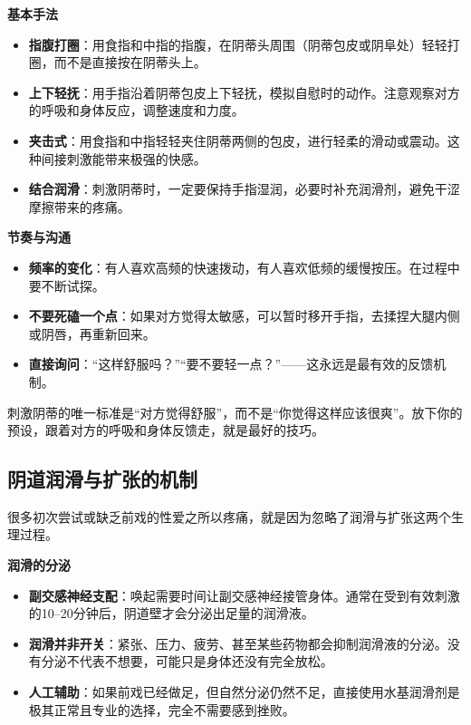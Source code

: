 \documentclass[12pt,UTF8]{ctexbook}
\begin{document}
\textbf{基本手法}

\begin{itemize}
\item \textbf{指腹打圈}：用食指和中指的指腹，在阴蒂头周围（阴蒂包皮或阴阜处）轻轻打圈，而不是直接按在阴蒂头上。
\item \textbf{上下轻抚}：用手指沿着阴蒂包皮上下轻抚，模拟自慰时的动作。注意观察对方的呼吸和身体反应，调整速度和力度。
\item \textbf{夹击式}：用食指和中指轻轻夹住阴蒂两侧的包皮，进行轻柔的滑动或震动。这种间接刺激能带来极强的快感。
\item \textbf{结合润滑}：刺激阴蒂时，一定要保持手指湿润，必要时补充润滑剂，避免干涩摩擦带来的疼痛。
\end{itemize}

\textbf{节奏与沟通}

\begin{itemize}
\item \textbf{频率的变化}：有人喜欢高频的快速拨动，有人喜欢低频的缓慢按压。在过程中要不断试探。
\item \textbf{不要死磕一个点}：如果对方觉得太敏感，可以暂时移开手指，去揉捏大腿内侧或阴唇，再重新回来。
\item \textbf{直接询问}：“这样舒服吗？”“要不要轻一点？”——这永远是最有效的反馈机制。
\end{itemize}

\begin{tcolorbox}[colback=pink!5!white,colframe=red!50!black,title=贴心小叮咛]
刺激阴蒂的唯一标准是“对方觉得舒服”，而不是“你觉得这样应该很爽”。放下你的预设，跟着对方的呼吸和身体反馈走，就是最好的技巧。
\end{tcolorbox}

\subsection{阴道润滑与扩张的机制}

很多初次尝试或缺乏前戏的性爱之所以疼痛，就是因为忽略了润滑与扩张这两个生理过程。

\textbf{润滑的分泌}

\begin{itemize}
\item \textbf{副交感神经支配}：唤起需要时间让副交感神经接管身体。通常在受到有效刺激的10--20分钟后，阴道壁才会分泌出足量的润滑液。
\item \textbf{润滑并非开关}：紧张、压力、疲劳、甚至某些药物都会抑制润滑液的分泌。没有分泌不代表不想要，可能只是身体还没有完全放松。
\item \textbf{人工辅助}：如果前戏已经做足，但自然分泌仍然不足，直接使用水基润滑剂是极其正常且专业的选择，完全不需要感到挫败。
\end{itemize}
\end{document}
